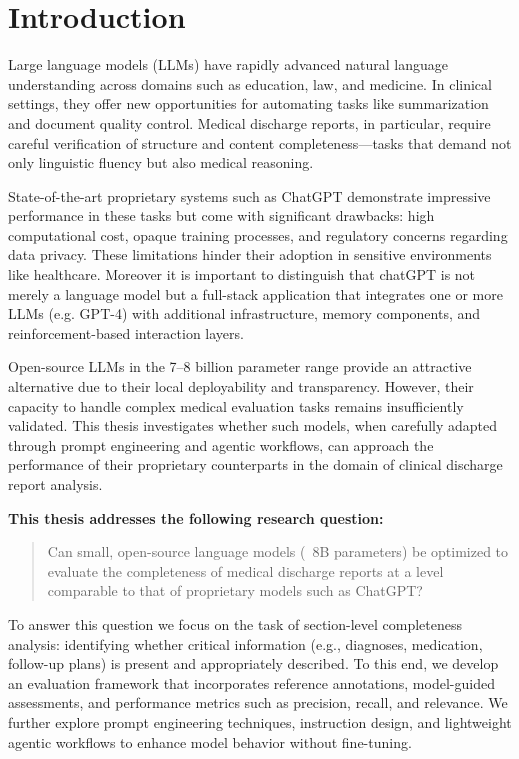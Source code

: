 \section{Introduction}
Large language models (LLMs) have rapidly advanced natural language understanding across domains such as education, law, and medicine.\cite{p0} In clinical settings, they offer new opportunities for automating tasks like summarization and document quality control. Medical discharge reports, in particular, require careful verification of structure and content completeness—tasks that demand not only linguistic fluency but also medical reasoning.

State-of-the-art proprietary systems such as ChatGPT demonstrate impressive
performance in these tasks but come with significant drawbacks: high
computational cost, opaque training processes, and regulatory concerns
regarding data privacy. These limitations hinder their adoption in sensitive
environments like healthcare. Moreover it is important to distinguish that
chatGPT is not merely a language model but a full-stack application that
integrates one or more LLMs (e.g. GPT-4) with additional infrastructure, memory
components, and reinforcement-based interaction layers.

Open-source LLMs in the 7–8 billion parameter range provide an attractive alternative due to their local deployability and transparency. However, their capacity to handle complex medical evaluation tasks remains insufficiently validated. This thesis investigates whether such models, when carefully adapted through prompt engineering and agentic workflows, can approach the performance of their proprietary counterparts in the domain of clinical discharge report analysis.

\vspace{2\baselineskip}

\textbf{This thesis addresses the following research question:}

\begin{quote}
Can small, open-source language models (~8B parameters) be optimized to evaluate the completeness of medical discharge reports at a level comparable to that of proprietary models such as ChatGPT?
\end{quote}

To answer this question we focus on the task of section-level completeness analysis: 
identifying whether critical information (e.g., diagnoses, medication, follow-up plans) 
is present and appropriately described. 
To this end, we develop an evaluation framework that incorporates reference annotations, 
model-guided assessments, and performance metrics such as precision, recall, and relevance.
We further explore prompt engineering techniques, instruction design, 
and lightweight agentic workflows to enhance model behavior without fine-tuning. 

\clearpage

